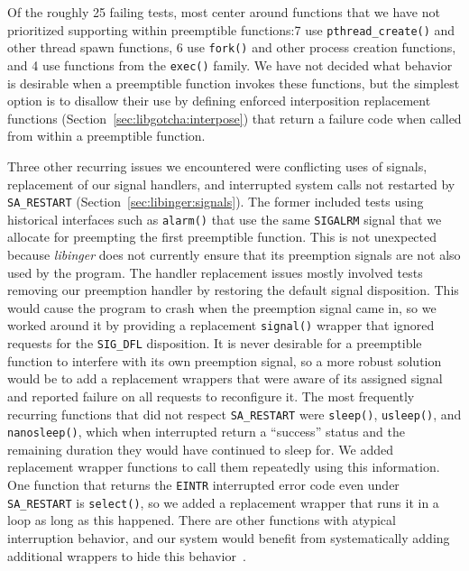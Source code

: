 Of the roughly 25 failing tests, most center around functions that we have not
prioritized supporting within preemptible functions:\@ 7 use
\texttt{pthread\_create()} and other thread spawn functions, 6 use \texttt{fork()}
and other process creation functions, and 4 use functions from the \texttt{exec()}
family.  We have not decided what behavior is desirable when a preemptible function
invokes these functions, but the simplest option is to disallow their use by defining
enforced interposition replacement functions (Section~\ref{sec:libgotcha:interpose})
that return a failure code when called from within a preemptible function.

Three other recurring issues we encountered were conflicting uses of signals,
replacement of our signal handlers, and interrupted system calls not restarted by
\texttt{SA\_RESTART} (Section~\ref{sec:libinger:signals}).  The former included tests
using historical interfaces such as \texttt{alarm()} that use the same
\texttt{SIGALRM} signal that we allocate for preempting the first preemptible
function.  This is not unexpected because \textit{libinger} does not currently ensure
that its preemption signals are not also used by the program.  The handler
replacement issues mostly involved tests removing our preemption handler by restoring
the default signal disposition.  This would cause the program to crash when the
preemption signal came in, so we worked around it by providing a replacement
\texttt{signal()} wrapper that ignored requests for the \texttt{SIG\_DFL}
disposition.  It is never desirable for a preemptible function to interfere with its
own preemption signal, so a more robust solution would be to add a replacement
wrappers that were aware of its assigned signal and reported failure on all requests
to reconfigure it.  The most frequently recurring functions that did not respect
\texttt{SA\_RESTART} were \texttt{sleep()}, \texttt{usleep()}, and
\texttt{nanosleep()}, which when interrupted return a ``success'' status and the
remaining duration they would have continued to sleep for.  We added replacement
wrapper functions to call them repeatedly using this information.  One function that
returns the \texttt{EINTR} interrupted error code even under \texttt{SA\_RESTART} is
\texttt{select()}, so we added a replacement wrapper that runs it in a loop as long as
this happened.  There are other functions with atypical interruption behavior, and
our system would benefit from systematically adding additional wrappers to hide this
behavior~\cite{signal-manpage}.

